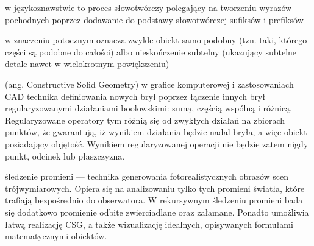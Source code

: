 \suppressfloats[t]

\begin{description}[\setleftmargin{65pt}\setlabelstyle{\bfseries}]
    \leftskip=1cm
    \item[derywacja]	w językoznawstwie to proces słowotwórczy polegający na
    tworzeniu wyrazów pochodnych poprzez dodawanie do podstawy słowotwórczej
    sufiksów i prefiksów
    \item[fraktal]		w znaczeniu potocznym oznacza zwykle obiekt samo-podobny
    (tzn. taki, którego części są podobne do całości) albo nieskończenie
    subtelny (ukazujący subtelne detale nawet w wielokrotnym powiększeniu)
    \item[CSG]			(ang. Constructive Solid Geometry) w grafice komputerowej i
    zastosowaniach CAD technika definiowania nowych brył poprzez łączenie innych brył
    regularyzowanymi działaniami boolowskimi: sumą, częścią wspólną i różnicą. Regularyzowane
    operatory tym różnią się od zwykłych działań na zbiorach punktów, że gwarantują,
    iż wynikiem działania będzie nadal bryła, a więc obiekt posiadający objętość. Wynikiem
    regularyzowanej operacji nie będzie zatem nigdy punkt, odcinek lub płaszczyzna.
    \item[ray-tracing]	śledzenie promieni --- technika
    generowania fotorealistycznych obrazów scen trójwymiarowych. Opiera się na analizowaniu tylko
    tych promieni światła, które trafiają bezpośrednio do obserwatora. W rekursywnym
    śledzeniu promieni bada się dodatkowo promienie odbite zwierciadlane oraz załamane.
    Ponadto umożliwia łatwą realizację CSG, a także wizualizację idealnych,
    opisywanych formułami matematycznymi obiektów.
\end{description}
